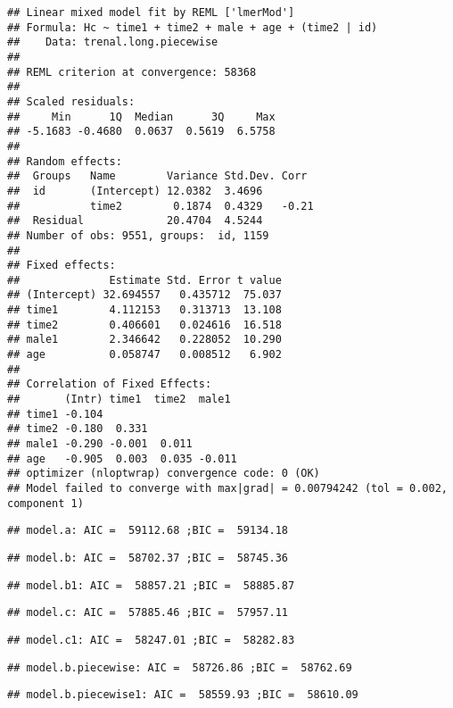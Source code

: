 \documentclass[
]{article}
\begin{document}
\begin{verbatim}
## Linear mixed model fit by REML ['lmerMod']
## Formula: Hc ~ time1 + time2 + male + age + (time2 | id)
##    Data: trenal.long.piecewise
## 
## REML criterion at convergence: 58368
## 
## Scaled residuals: 
##     Min      1Q  Median      3Q     Max 
## -5.1683 -0.4680  0.0637  0.5619  6.5758 
## 
## Random effects:
##  Groups   Name        Variance Std.Dev. Corr 
##  id       (Intercept) 12.0382  3.4696        
##           time2        0.1874  0.4329   -0.21
##  Residual             20.4704  4.5244        
## Number of obs: 9551, groups:  id, 1159
## 
## Fixed effects:
##              Estimate Std. Error t value
## (Intercept) 32.694557   0.435712  75.037
## time1        4.112153   0.313713  13.108
## time2        0.406601   0.024616  16.518
## male1        2.346642   0.228052  10.290
## age          0.058747   0.008512   6.902
## 
## Correlation of Fixed Effects:
##       (Intr) time1  time2  male1 
## time1 -0.104                     
## time2 -0.180  0.331              
## male1 -0.290 -0.001  0.011       
## age   -0.905  0.003  0.035 -0.011
## optimizer (nloptwrap) convergence code: 0 (OK)
## Model failed to converge with max|grad| = 0.00794242 (tol = 0.002, component 1)
\end{verbatim}

\begin{verbatim}
## model.a: AIC =  59112.68 ;BIC =  59134.18
\end{verbatim}

\begin{verbatim}
## model.b: AIC =  58702.37 ;BIC =  58745.36
\end{verbatim}

\begin{verbatim}
## model.b1: AIC =  58857.21 ;BIC =  58885.87
\end{verbatim}

\begin{verbatim}
## model.c: AIC =  57885.46 ;BIC =  57957.11
\end{verbatim}

\begin{verbatim}
## model.c1: AIC =  58247.01 ;BIC =  58282.83
\end{verbatim}

\begin{verbatim}
## model.b.piecewise: AIC =  58726.86 ;BIC =  58762.69
\end{verbatim}

\begin{verbatim}
## model.b.piecewise1: AIC =  58559.93 ;BIC =  58610.09
\end{verbatim}
\end{document}
